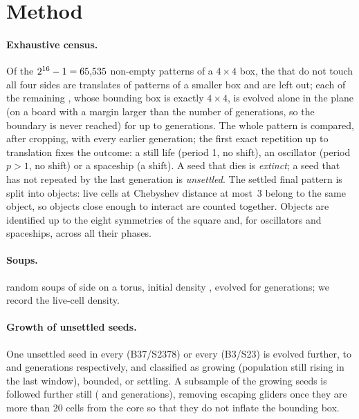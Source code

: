 \documentclass[11pt,a4paper]{article}
\begin{document}
\section{Method}

\paragraph{Exhaustive census.} Of the $2^{16}-1=65{,}535$ non-empty patterns of a
$4\times4$ box, the \trasladadasCasa{} that do not touch all four sides are translates of
patterns of a smaller box and are left out; each of the remaining
\evaluadasCasaSemillas{}, whose bounding box is exactly $4\times4$, is evolved alone in the
plane (on a board with
a margin larger than the number of generations, so the boundary is never reached) for
up to \gensCasa{} generations. The whole pattern is compared, after cropping, with
every earlier generation; the first exact repetition up to translation fixes the
outcome: a still life (period 1, no shift), an oscillator (period $p>1$, no shift) or a
spaceship (a shift). A seed that dies is \emph{extinct}; a seed that has not repeated
by the last generation is \emph{unsettled}. The settled final pattern is split into
objects: live cells at Chebyshev distance at most~3 belong to the same object, so
objects close enough to interact are counted together. Objects are identified up to the
eight symmetries of the square and, for oscillators and spaceships, across all their
phases.

\paragraph{Soups.} \sopasCasa{} random soups of side \sopaladoCasa{} on a torus, initial
density \sopainicialCasa, evolved for \sopagensCasa{} generations; we record the
live-cell density.

\paragraph{Growth of unsettled seeds.} One unsettled seed in every \muestraCasa{}
(B37/S2378) or every \muestraConway{} (B3/S23) is evolved further, to \lejosCasa{} and
\lejosConway{} generations respectively, and classified as growing (population still
rising in the last window), bounded, or settling. A subsample of the growing seeds is
followed further still (\lejoslejosCasa{} and \lejoslejosConway{} generations),
removing escaping gliders once they are more than 20 cells from the core so that they
do not inflate the bounding box.
\end{document}
